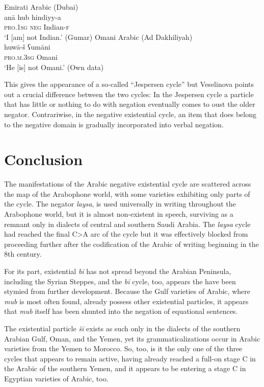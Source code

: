 \documentclass[output=paper,colorlinks,citecolor=brown]{langscibook}
\begin{document}
\ea \label{ex:WiAR-36}
  \ea Emirati Arabic (Dubai)\\
  	\gll anā hub hindiyy-a\\
  	\textsc{pro.1sg} \textsc{neg} Indian-\textsc{f}\\
  	\glt ‘I [am] not Indian.’ (Gumar)
  \ex Omani Arabic (Ad Dakhiliyah)\\
  	\gll huwā-š ʕumāni\\
  	\textsc{pro.m.3sg} Omani\\
  	\glt ‘He [is] not Omani.’ (Own data)
\z \z

This gives the appearance of a so-called “Jespersen cycle” but Veselinova \citeyear[53]{Veselinova2016} points out a crucial difference between the two cycles: In the Jespersen cycle a particle that has little or nothing to do with negation eventually comes to oust the older negator. Contrariwise, in the negative existential cycle, an item that does belong to the negative domain is gradually incorporated into verbal negation.

\section{Conclusion} \label{s:WiAR-6}
\largerpage
The manifestations of the Arabic negative existential cycle are scattered across the map of the Arabophone world, with some varieties exhibiting only parts of the cycle. The negator \textit{laysa}, is used universally in writing throughout the Arabophone world, but it is almost non-existent in speech, surviving as a remnant only in dialects of central and southern Saudi Arabia. The \textit{laysa} cycle had reached the final C>A arc of the cycle but it was effectively blocked from proceeding further after the codification of the Arabic of writing beginning in the 8th century.

For its part, existential \textit{bī} has not spread beyond the Arabian Peninsula, including the Syrian Steppes, and the \textit{bī} cycle, too, appears the have been stymied from further development. Because the Gulf varieties of Arabic, where \textit{mub} is most often found, already possess other existential particles, it appears that \textit{mub} itself has been shunted into the negation of equational sentences.

The existential particle \textit{šī} exists as such only in the dialects of the southern Arabian Gulf, Oman, and the Yemen, yet its grammaticalizations occur in Arabic varieties from the Yemen to Morocco. So, too, is it the only one of the three cycles that appears to remain active, having already reached a full-on stage C in the Arabic of the southern Yemen, and it appears to be entering a stage C in Egyptian varieties of Arabic, too.
\end{document}

